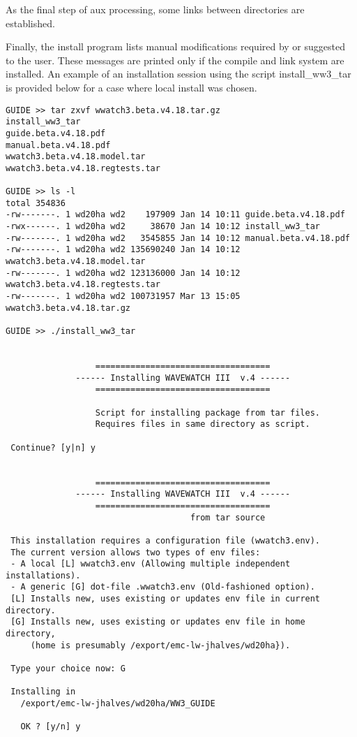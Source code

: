 As the final step of {\file aux} processing, some links between directories are established.

Finally, the install program lists manual modifications required by or
suggested to the user. These messages are printed only if the compile and link
system are installed. An example of an installation session using the script
{\file install\_ww3\_tar} is provided below for a case where local install was
chosen.

\pb

\begin{minipage}[c]{4.5in}
{\scriptsize \begin{verbatim}
GUIDE >> tar zxvf wwatch3.beta.v4.18.tar.gz 
install_ww3_tar
guide.beta.v4.18.pdf
manual.beta.v4.18.pdf
wwatch3.beta.v4.18.model.tar
wwatch3.beta.v4.18.regtests.tar

GUIDE >> ls -l
total 354836
-rw-------. 1 wd20ha wd2    197909 Jan 14 10:11 guide.beta.v4.18.pdf
-rwx------. 1 wd20ha wd2     38670 Jan 14 10:12 install_ww3_tar
-rw-------. 1 wd20ha wd2   3545855 Jan 14 10:12 manual.beta.v4.18.pdf
-rw-------. 1 wd20ha wd2 135690240 Jan 14 10:12 wwatch3.beta.v4.18.model.tar
-rw-------. 1 wd20ha wd2 123136000 Jan 14 10:12 wwatch3.beta.v4.18.regtests.tar
-rw-------. 1 wd20ha wd2 100731957 Mar 13 15:05 wwatch3.beta.v4.18.tar.gz

GUIDE >> ./install_ww3_tar 


                  ===================================
              ------ Installing WAVEWATCH III  v.4 ------
                  =================================== 

                  Script for installing package from tar files. 
                  Requires files in same directory as script.

 Continue? [y|n] y


                  ===================================
              ------ Installing WAVEWATCH III  v.4 ------
                  ===================================
                                     from tar source 

 This installation requires a configuration file (wwatch3.env).
 The current version allows two types of env files: 
 - A local [L] wwatch3.env (Allowing multiple independent installations).
 - A generic [G] dot-file .wwatch3.env (Old-fashioned option).
 [L] Installs new, uses existing or updates env file in current directory.
 [G] Installs new, uses existing or updates env file in home directory, 
     (home is presumably /export/emc-lw-jhalves/wd20ha}). 

 Type your choice now: G

 Installing in 
   /export/emc-lw-jhalves/wd20ha/WW3_GUIDE

   OK ? [y/n] y

\end{verbatim}}
\end{minipage}

